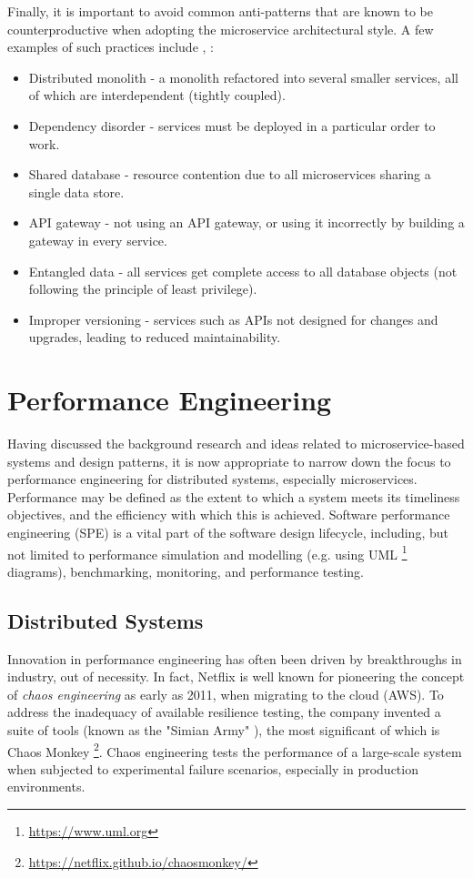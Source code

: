 Finally, it is important to avoid common anti-patterns that are known to be counterproductive when adopting the microservice architectural style. A few examples of such practices include \cite{alagarasan15}, \cite{kanjilal21}:

\begin{itemize}
  \item Distributed monolith - a monolith refactored into several smaller services, all of which are interdependent (tightly coupled).
  \item Dependency disorder - services must be deployed in a particular order to work.
  \item Shared database - resource contention due to all microservices sharing a single data store.
  \item API gateway - not using an API gateway, or using it incorrectly by building a gateway in every service.
  \item Entangled data - all services get complete access to all database objects (not following the principle of least privilege).
  \item Improper versioning - services such as APIs not designed for changes and upgrades, leading to reduced maintainability.
\end{itemize}

\section{Performance Engineering}

Having discussed the background research and ideas related to microservice-based systems and design patterns, it is now appropriate to narrow down the focus to performance engineering for distributed systems, especially microservices. Performance may be defined as the extent to which a system meets its timeliness objectives, and the efficiency with which this is achieved. Software performance engineering (SPE) is a vital part of the software design lifecycle, including, but not limited to performance simulation and modelling (e.g. using UML \footnote{\url{https://www.uml.org}} diagrams), benchmarking, monitoring, and performance testing.

\subsection{Distributed Systems}

Innovation in performance engineering has often been driven by breakthroughs in industry, out of necessity. In fact, Netflix is well known for pioneering the concept of \textit{chaos engineering} as early as 2011, when migrating to the cloud (AWS). To address the inadequacy of available resilience testing, the company invented a suite of tools (known as the "Simian Army" \cite{netflix-chaos}), the most significant of which is Chaos Monkey \footnote{\url{https://netflix.github.io/chaosmonkey/}}. Chaos engineering tests the performance of a large-scale system when subjected to experimental failure scenarios, especially in production environments.

